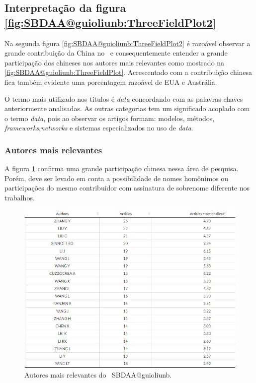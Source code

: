 \subsection{Interpretação da figura \ref{fig:SBDAA@guioliunb:ThreeFieldPlot2}}

Na segunda figura \ref{fig:SBDAA@guioliunb:ThreeFieldPlot2} é razoável  observar a grande contribuição da China no \dataset\ e consequentemente entender a grande participação dos chineses nos autores mais relevantes como mostrado na \ref{fig:SBDAA@guioliunb:ThreeFieldPlot}. Acrescentado com a contribuição chinesa fica também evidente uma porcentagem razoável de EUA e Austrália.

O termo mais utilizado nos títulos é \textit{data} concordando com as palavras-chaves anteriormente analisadas. As outras categorias tem um significado acoplado com o termo \textit{data}, pois ao observar os artigos formam: modelos, métodos, \textit{frameworks},\textit{networks} e sistemas especializados no uso de \textit{data}.


\subsubsection{Autores mais relevantes\label{MASSA:Sankey:AutoresRelevantes}}

A figura \ref{fig:SBDAA@guioliunb:relevantauthors} confirma uma grande participação chinesa nessa área de pesquisa. Porém, deve ser levado em conta a possibilidade de nomes homônimos ou participações do mesmo contribuidor com assinatura de sobrenome diferente nos trabalhos.

\begin{figure}
    \centering
    \includegraphics[angle=0,width=1\textwidth]{experiments/guioliunb/AnaliseBibliometrica/SocialBigDataAnalysis/most relevant authors.png}
    \caption{Autores mais relevantes do \dataset\   SBDAA@guioliunb.}
    \label{fig:SBDAA@guioliunb:relevantauthors}
\end{figure}


